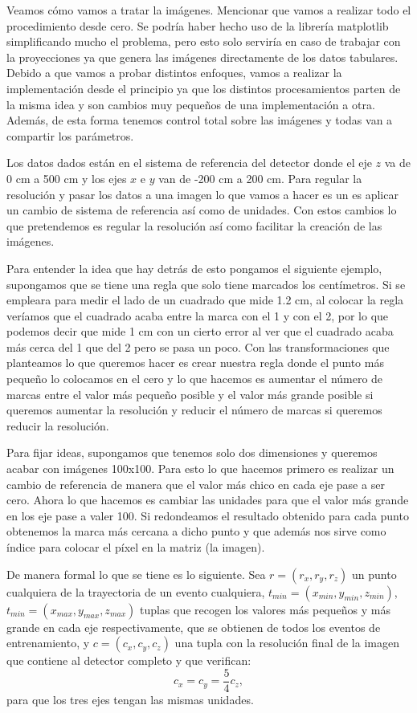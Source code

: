 \documentclass[a4paper,12pt,twoside,titlepage]{article}
\begin{document}
Veamos cómo vamos a tratar la imágenes. Mencionar que vamos a realizar todo el procedimiento desde cero. Se podría haber hecho uso de la librería matplotlib simplificando mucho el problema, pero esto solo serviría en caso de trabajar con la proyecciones ya que genera las imágenes directamente de los datos tabulares. Debido a que vamos a probar distintos enfoques, vamos a realizar la implementación desde el principio ya que los distintos procesamientos parten de la misma idea y son cambios muy pequeños de una implementación a otra. Además, de esta forma tenemos control total sobre las imágenes y todas van a compartir los parámetros.

Los datos dados están en el sistema de referencia del detector donde el eje $z$ va de 0 cm a 500 cm y los ejes $x$ e $y$ van de -200 cm a 200 cm. Para regular la resolución y pasar los datos a una imagen lo que vamos a hacer es un es aplicar un cambio de sistema de referencia así como de unidades. Con estos cambios lo que pretendemos es regular la resolución así como facilitar la creación de las imágenes.

Para entender la idea que hay detrás de esto pongamos el siguiente ejemplo, supongamos que se tiene una regla que solo tiene marcados los centímetros. Si se empleara para medir el lado de un cuadrado que mide 1.2 \si[]{cm}, al colocar la regla veríamos que el cuadrado acaba entre la marca con el 1 y con el 2, por lo que podemos decir que mide 1 \si[]{cm} con un cierto error al ver que el cuadrado acaba más cerca del 1 que del 2 pero se pasa un poco. Con las transformaciones que planteamos lo que queremos hacer es crear nuestra regla donde el punto más pequeño lo colocamos en el cero y lo que hacemos es aumentar el número de marcas entre el valor más pequeño posible y el valor más grande posible si queremos aumentar la resolución y reducir el número de marcas si queremos reducir la resolución.

Para fijar ideas, supongamos que tenemos solo dos dimensiones y queremos acabar con imágenes 100x100. Para esto lo que hacemos primero es realizar un cambio de referencia de manera que el valor más chico en cada eje pase a ser cero. Ahora lo que hacemos es cambiar las unidades para que el valor más grande en los eje pase a valer 100. Si redondeamos el resultado obtenido para cada punto obtenemos la marca más cercana a dicho punto y que además nos sirve como índice para colocar el píxel en la matriz (la imagen).

De manera formal lo que se tiene es lo siguiente. Sea ${r} = (r_x, r_y, r_z)$ un punto cualquiera de la trayectoria de un evento cualquiera, $t_{min} = (x_{min}, y_{min}, z_{min})$, $t_{min} = (x_{max}, y_{max}, z_{max})$ tuplas que recogen los valores más pequeños y más grande en cada eje respectivamente, que se obtienen de todos los eventos de entrenamiento, y $c = (c_x, c_y, c_z)$ una tupla con la resolución final de la imagen que contiene al detector completo y que verifican:
\begin{equation}
  \label{eq:resolucion}
  c_x = c_y = \frac{5}{4}c_z,
\end{equation}
para que los tres ejes tengan las mismas unidades.
\end{document}
